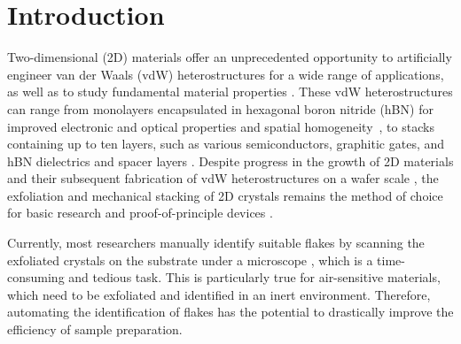 \documentclass[reprint, prl, superscriptaddress, floatfix]{revtex4-2}
\begin{document}

\maketitle
\date{\today}

\section{Introduction}

Two-dimensional (2D) materials offer an unprecedented opportunity to artificially engineer van der Waals (vdW) heterostructures for a wide range of applications, as well as to study fundamental material properties \cite{Geim2013}. 
These vdW heterostructures can range from monolayers encapsulated in hexagonal boron nitride (hBN) for improved electronic and optical properties and spatial homogeneity~\cite{Dean2010, Neumann2015,Banszerus2015Jul, Cadiz2017, Raja2019}, to stacks containing up to ten layers, such as various semiconductors, graphitic gates, and hBN dielectrics and spacer layers \cite{Xu2020, Park2021, Liu2021}.
Despite progress in the growth of 2D materials \cite{Backes2020Jan,Burton2023Jan} and their subsequent fabrication of vdW heterostructures on a wafer scale \cite{Liu2021_review, Xu2022}, the exfoliation and mechanical stacking of 2D crystals remains the method of choice for basic research and proof-of-principle devices \cite{Liu2016}.

Currently, most researchers manually identify suitable flakes by scanning the exfoliated crystals on the substrate under a microscope \cite{Novoselov2005_2dcrystal}, which is a time-consuming and tedious task.
This is particularly true for air-sensitive materials, which need to be exfoliated and identified in an inert environment. 
Therefore, automating the identification of flakes has the potential to drastically improve the efficiency of sample preparation.
\end{document}
